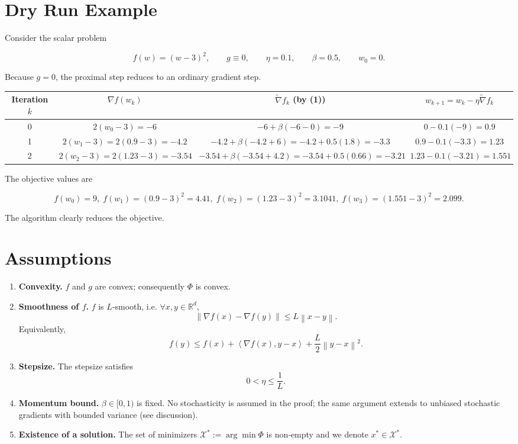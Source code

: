 \documentclass[11pt]{article}
\newcommand{\norm}[1]{\left\lVert #1\right\rVert}
\newcommand{\inner}[2]{\left\langle #1,#2\right\rangle}
\newcommand{\R}{\mathbb{R}}
\begin{document}
\vspace{0.2cm}
\section*{Dry Run Example}
Consider the scalar problem  

\[
f(w)=(w-3)^{2},\qquad g\equiv0,\qquad \eta=0.1,\qquad \beta=0.5,\qquad w_{0}=0.
\]

Because $g=0$, the proximal step reduces to an ordinary gradient step.  

\begin{center}
\begin{tabular}{c|c|c|c}
Iteration $k$ & $\nabla f(w_{k})$ & $\tilde\nabla f_{k}$ (by (1)) & $w_{k+1}=w_{k}-\eta\tilde\nabla f_{k}$ \\ \hline
0 & $2(w_{0}-3)=-6$ & $-6+\beta(-6-0)=-9$ & $0-0.1(-9)=0.9$ \\ 
1 & $2(w_{1}-3)=2(0.9-3)=-4.2$ & $-4.2+\beta(-4.2+6)= -4.2+0.5(1.8)= -3.3$ & $0.9-0.1(-3.3)=1.23$ \\ 
2 & $2(w_{2}-3)=2(1.23-3)=-3.54$ & $-3.54+\beta(-3.54+4.2)= -3.54+0.5(0.66)= -3.21$ & $1.23-0.1(-3.21)=1.551$ 
\end{tabular}
\end{center}
The objective values are  

\[
f(w_{0})=9,\; f(w_{1})=(0.9-3)^{2}=4.41,\; f(w_{2})=(1.23-3)^{2}=3.1041,\; f(w_{3})=(1.551-3)^{2}=2.099.
\]

The algorithm clearly reduces the objective.

\vspace{0.5cm}
\section*{Assumptions}
\begin{enumerate}[label=\textbf{A\arabic*.}, leftmargin=*, itemsep=2pt]
\item \label{A1} \textbf{Convexity.} $f$ and $g$ are convex; consequently $\Phi$ is convex.
\item \label{A2} \textbf{Smoothness of $f$.} $f$ is $L$‑smooth, i.e. $\forall x,y\in\R^{d}$,
\[
\norm{\nabla f(x)-\nabla f(y)}\le L\norm{x-y}. \tag{2}
\]
Equivalently,
\[
f(y)\le f(x)+\inner{\nabla f(x)}{y-x}+\frac{L}{2}\norm{y-x}^{2}. \tag{3}
\]
\item \label{A3} \textbf{Stepsize.} The stepsize satisfies 
\[
0<\eta\le\frac{1}{L}. \tag{4}
\]
\item \label{A4} \textbf{Momentum bound.} $\beta\in[0,1)$ is fixed. No stochasticity is assumed in the proof; the same argument extends to unbiased stochastic gradients with bounded variance (see discussion).
\item \label{A5} \textbf{Existence of a solution.} The set of minimizers $\mathcal{X}^{*}:=\arg\min\Phi$ is non‑empty and we denote $x^{*}\in\mathcal{X}^{*}$.
\end{enumerate}
\end{document}
